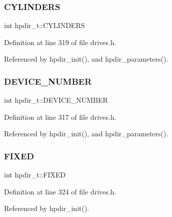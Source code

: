 \subsubsection{\texorpdfstring{C\+Y\+L\+I\+N\+D\+E\+RS}{CYLINDERS}}
{\footnotesize\ttfamily int hpdir\+\_\+t\+::\+C\+Y\+L\+I\+N\+D\+E\+RS}



Definition at line 319 of file drives.\+h.



Referenced by hpdir\+\_\+init(), and hpdir\+\_\+parameters().

\mbox{\label{structhpdir__t_a74e34ba48c9b35e0551051ad67cd069a}} 
\subsubsection{\texorpdfstring{D\+E\+V\+I\+C\+E\+\_\+\+N\+U\+M\+B\+ER}{DEVICE\_NUMBER}}
{\footnotesize\ttfamily int hpdir\+\_\+t\+::\+D\+E\+V\+I\+C\+E\+\_\+\+N\+U\+M\+B\+ER}



Definition at line 317 of file drives.\+h.



Referenced by hpdir\+\_\+init(), and hpdir\+\_\+parameters().

\mbox{\label{structhpdir__t_aadd83c87e729700a5a688fed3efb2ca5}} 
\subsubsection{\texorpdfstring{F\+I\+X\+ED}{FIXED}}
{\footnotesize\ttfamily int hpdir\+\_\+t\+::\+F\+I\+X\+ED}



Definition at line 324 of file drives.\+h.



Referenced by hpdir\+\_\+init().

\mbox{\label{structhpdir__t_a0fc9ceb850b11adfbcb1f256d628ada0}} 
